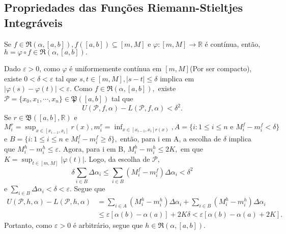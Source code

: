 \documentclass[Analysis/analysis_notes.tex]{subfiles}
\begin{document}
\subsection{Propriedades das Fun\c cões Riemann-Stieltjes Integráveis}
\begin{theorem*}
	Se \(f\in \mathfrak{R}(\alpha ,[a,b]), f([a, b])\subseteq{[m, M]}\) e \(\varphi :[m, M]\rightarrow \mathbb{R}\) é contínua,
	então, \(h=\varphi\circ{f}\in \mathfrak{R}(\alpha , [a,b]).\)
\end{theorem*}
\begin{proof*}
	Dado \(\varepsilon >0\), como \(\varphi \) é uniformemente contínua em \([m, M]\)(Por ser compacto),
	existe \(0 < \delta  < \varepsilon \) tal que \(s, t\in[m, M], |s-t|\leq \delta \) implica em \(|\varphi (s)-\varphi (t)| < \varepsilon .\)
	Como \(f\in \mathfrak{R}(\alpha , [a, b]),\) existe \(\mathcal{P} = \{x_{0}, x_{1}, \cdots, x_{n}\}\in \mathfrak{P}([a, b])\) tal que
	\[
		U(\mathcal{P}, f, \alpha ) - L(\mathcal{P}, f, \alpha ) < \delta^{2}.
	\]
	Se \(r\in \mathfrak{B}([a, b], \mathbb{R})\) e \(M_{i}^{r} = \sup_{x\in[x_{i-1}, x_{i}]}r(x), m_{i}^{r} = \inf_{x\in[x_{i-1}, x_{i}]r(x)},
	A = \{i: 1\leq i\leq n\text{ e } M_{i}^{f}-m_{i}^{f} < \delta \}\) e \(B = \{i: 1\leq i\leq n\text{ e } M_{i}^{f}-m_{i}^{f}\geq \delta\},\) então,
	para i em A, a escolha de \(\delta \) implica que \(M_{i}^{h} - m_{i}^{h}\leq \varepsilon .\) Agora, para i em B,
	\(M_{i}^{h}-m_{i}^{h}\leq 2K,\) em que \(K=\sup_{t\in[m, M]}|\varphi (t)|\). Logo, da escolha de \(\mathcal{P},\)
	\[
		\delta \sum\limits_{i\in B}^{}\Delta \alpha_{i}\leq \sum\limits_{i\in B}^{}(M_{i}^{f}-m_{i}^{f})\Delta \alpha_{i} < \delta^{2}
	\]
	e \(\sum\limits_{i\in B}^{}\Delta\alpha_{i} < \delta <\varepsilon .\) Segue que
	\begin{align*}
		U(\mathcal{P}, h, \alpha ) - L(\mathcal{P}, h, \alpha ) & = \sum\limits_{i\in A}^{}(M_{i}^{h}-m_{i}^{h})\Delta \alpha_{i} + \sum\limits_{i\in B}^{}(M_{i}^{h}-m_{i}^{h})\Delta\alpha_{i} \\
		                                                        & \leq \varepsilon [\alpha (b)-\alpha (a)]+2K\delta < \varepsilon [\alpha (b)-\alpha (a)+2K].
	\end{align*}
	Portanto, como \(\varepsilon >0\) é arbitrário, segue que \(h\in \mathfrak{R}(\alpha , [a, b]).\)\qedsymbol
\end{proof*}
\end{document}
